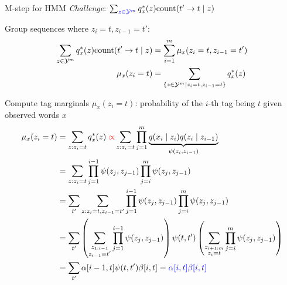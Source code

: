 \documentclass[usenames,dvipsnames,notes]{beamer}
\begin{document}
\begin{frame}
    {M-step for HMM}
    \emph{Challenge}: $\sum_{{\color{blue}z\in\mathcal{Y}^m}} q^*_x(z) \text{count}(t'\rightarrow t\mid z)$

    \vspace{5em}
    
    \begin{center}
    \end{center}
    Group sequences where $z_i=t, z_{i-1}=t'$:
    \begin{align*}
    \sum_{{z\in\mathcal{Y}^m}} q^*_x(z) \text{count}(t'\rightarrow t\mid z)
        &= \sum_{i=1}^m \mu_x(z_i=t,z_{i-1}=t')  \\
        \mu_x(z_i=t) &= \sum_{\left\{ z\in\mathcal{Y}^m \mid z_i=t, z_{i-1}=t \right\}} q^*_x(z)
    \end{align*}
\end{frame}

\begin{frame}
    {Compute tag marginals}
    $\mu_x(z_i=t)$: probability of the $i$-th tag being $t$ given observed words $x$
    \begin{align*}
        \mu_x(z_i=t) &= \sum_{z: z_i=t} q^*_x(z) \;
        {\color{red}\propto} \sum_{z: z_i=t} \prod_{j=1}^m \underbrace{q(x_i\mid z_i) q(z_i\mid z_{i-1})}_{\psi(z_i,z_{i-1})} \\
        &= \sum_{z: z_i=t} \prod_{j=1}^{i-1}\psi(z_j,z_{j-1})\prod_{j=i}^m\psi(z_j,z_{j-1}) \\
        &= \sum_{t'} \sum_{z: z_i=t,z_{i-1}=t'} \prod_{j=1}^{i-1}\psi(z_j,z_{j-1})\prod_{j=i}^m\psi(z_j,z_{j-1}) \\
        &= \sum_{t'} \left( 
            \sum_{\substack{z_{1:i-1}\\z_{i-1}=t'}}  \prod_{j=1}^{i-1}\psi(z_j,z_{j-1})
         \right)
        \psi(t,t')
        \left( \sum_{\substack{z_{i+1:m}\\z_i=t}} \prod_{j=i}^{m}\psi(z_j,z_{j-1})
         \right) \\
        &= \sum_{t'} \alpha[i-1, t] \psi(t,t') \beta[i, t]
        = {\color{blue}\alpha[i,t] \beta[i,t]}
    \end{align*}
\end{frame}
\end{document}
